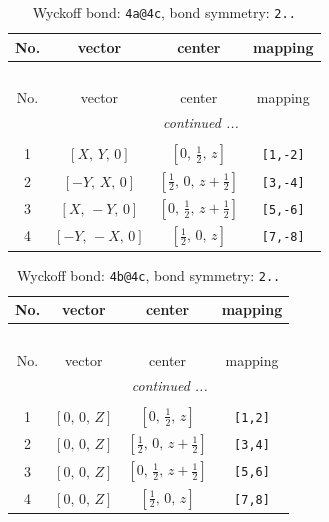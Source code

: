 \documentclass[fleqn,8pt]{jsarticle}
\begin{document}
\begin{longtable}{cccc}
\caption{Wyckoff bond: {\tt 4a@4c}, bond symmetry: {\tt 2..}}
 \\
 \hline \hline
No. & vector & center & mapping \\ \hline \endfirsthead

\multicolumn{3}{l}{\tablename\ \thetable{}} \\
 \hline \hline
No. & vector & center & mapping \\ \hline \endhead

 \hline \hline
\multicolumn{3}{r}{\footnotesize\it continued ...} \\ \endfoot

 \hline \hline
\multicolumn{3}{r}{} \\ \endlastfoot

1 & $\left[ X,\, Y,\, 0 \right]$ & $\left[ 0,\, \frac{1}{2},\, z \right]$ & {\tt [1,-2]} \\ \hline
2 & $\left[ - Y,\, X,\, 0 \right]$ & $\left[ \frac{1}{2},\, 0,\, z + \frac{1}{2} \right]$ & {\tt [3,-4]} \\ \hline
3 & $\left[ X,\, - Y,\, 0 \right]$ & $\left[ 0,\, \frac{1}{2},\, z + \frac{1}{2} \right]$ & {\tt [5,-6]} \\ \hline
4 & $\left[ - Y,\, - X,\, 0 \right]$ & $\left[ \frac{1}{2},\, 0,\, z \right]$ & {\tt [7,-8]} \\
\end{longtable}
\renewcommand{\arraystretch}{1.2}
\begin{longtable}{cccc}
\caption{Wyckoff bond: {\tt 4b@4c}, bond symmetry: {\tt 2..}}
 \\
 \hline \hline
No. & vector & center & mapping \\ \hline \endfirsthead

\multicolumn{3}{l}{\tablename\ \thetable{}} \\
 \hline \hline
No. & vector & center & mapping \\ \hline \endhead

 \hline \hline
\multicolumn{3}{r}{\footnotesize\it continued ...} \\ \endfoot

 \hline \hline
\multicolumn{3}{r}{} \\ \endlastfoot

1 & $\left[ 0,\, 0,\, Z \right]$ & $\left[ 0,\, \frac{1}{2},\, z \right]$ & {\tt [1,2]} \\ \hline
2 & $\left[ 0,\, 0,\, Z \right]$ & $\left[ \frac{1}{2},\, 0,\, z + \frac{1}{2} \right]$ & {\tt [3,4]} \\ \hline
3 & $\left[ 0,\, 0,\, Z \right]$ & $\left[ 0,\, \frac{1}{2},\, z + \frac{1}{2} \right]$ & {\tt [5,6]} \\ \hline
4 & $\left[ 0,\, 0,\, Z \right]$ & $\left[ \frac{1}{2},\, 0,\, z \right]$ & {\tt [7,8]} \\
\end{longtable}
\end{document}
